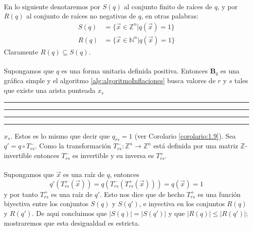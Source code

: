 \paragraph{}
En lo siguiente denotaremos por $S(q)$ al conjunto finito de raíces de $q$, y por $R(q)$ al conjunto de raíces no negativas de $q$, en otras palabras:
\begin{equation*}
\begin{split}
S(q) & =\{ \overrightarrow{x} \in \mathbb{Z}^{n} | q\left(\overrightarrow{x}\right) = 1 \}\\
R(q) & = \{ \overrightarrow{x} \in \mathbb{N}^{n} | q\left(\overrightarrow{x}\right) = 1 \}
\end{split}
\end{equation*}
Claramente $R(q) \subseteq S(q)$.

\newpage
\paragraph{}
Supongamos que $q$ es una forma unitaria definida positiva. Entonces $\textbf{B}_{q}$ es una gráfica simple y el algoritmo \ref{alg:algoritmoInflaciones} busca valores de $r$ y $s$ tales que existe una arista punteada $x_{r}$ \rule[1mm]{.1cm}{0.4pt} \rule[1mm]{.1cm}{0.4pt} \rule[1mm]{.1cm}{0.4pt} \rule[1mm]{.1cm}{0.4pt} $x_{s}$. Estos es lo mismo que decir que $q_{rs} = 1$ (ver Corolario \ref{corolario:1.9}). Sea $q' = q \circ T_{rs}^{-} $. Como la transformación $T_{rs}^{-}: \mathbb{Z}^{n} \rightarrow \mathbb{Z}^{n}$ está definida por una matriz $\mathbb{Z}$-invertible entonces $T_{rs}^{-}$ es invertible y su inversa es $T_{rs}^{+}$.
\paragraph{}
Supongamos que $\overrightarrow{x}$ es una raíz de $q$, entonces
\begin{equation*}
q'\left(T_{rs}^{+}\left(\overrightarrow{x}\right)\right) = q\left(T_{rs}^{-}\left(T_{rs}^{+} \left(\overrightarrow{x}\right)\right)\right) = q\left(\overrightarrow{x}\right) = 1
\end{equation*}
y por tanto $T_{rs}^{+}$ es una raíz de $q'$. Esto nos dice que de hecho $T_{rs}^{+}$ es una función biyectiva entre los conjuntos $S\left(q\right)$ y $S\left(q'\right)$, e inyectiva en los conjuntos $R\left(q\right)$ y $R\left(q'\right)$. De aqui concluimos que $\left|S\left(q\right)\right| =  \left|S\left(q'\right)\right|$ y que $\left|R\left(q\right)\right| \leq \left|R\left(q'\right)\right|$; mostraremos que esta desigualdad es estricta.
